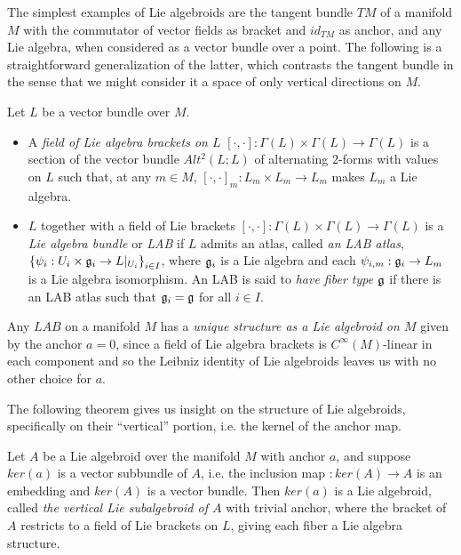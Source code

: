 \linea 

The simplest examples of Lie algebroids are the tangent bundle $TM$ of a manifold $M$ with the commutator of vector fields as bracket and $id_{TM}$ as anchor, and any Lie algebra, when considered as a vector bundle over a point. The following is a straightforward generalization of the latter, which contrasts the tangent bundle in the sense that we might consider it a space of only vertical directions on $M$.

\begin{definition}[LAB]\label{defnLAB}
    Let $L$ be a vector bundle over $M$.
    
    \begin{itemize}
    
    \item A \emph{field of Lie algebra brackets on $L$} $[\cdot, \cdot]:\Gamma(L) \times \Gamma(L) \to \Gamma(L)$ is a section of the vector bundle $Alt^2(L; L)$ of alternating $2$-forms with values on $L$ such that, at any $m \in M$, $[\cdot, \cdot]_m:L_m \times L_m \to L_m$ makes $L_m$ a Lie algebra.
    
    \item $L$ together with a field of Lie brackets $[\cdot, \cdot]:\Gamma(L) \times \Gamma(L) \to \Gamma(L)$ is a \emph{Lie algebra bundle} or \emph{LAB} if $L$ admits an atlas, called \emph{an LAB atlas}, $\left\{ \psi_i: U_i \times \mathfrak{g}_i \to L|_{U_i} \right\}_{i \in I}$, where $\mathfrak{g}_i$ is a Lie algebra and each $\psi_{i, m}: \mathfrak{g}_i \to L_m$ is a Lie algebra isomorphism. An LAB is said to \emph{have fiber type $\mathfrak{g}$} if there is an LAB atlas such that $\mathfrak{g}_i = \mathfrak{g}$ for all $i \in I$.
    
    \end{itemize}
    
\end{definition}

Any $LAB$ on a manifold $M$ has a \emph{unique structure as a Lie algebroid on $M$} given by the anchor $a = 0$, since a field of Lie algebra brackets is $C^\infty(M)$-linear in each component and so the Leibniz identity of Lie algebroids leaves us with no other choice for $a$.

The following theorem gives us insight on the structure of Lie algebroids, specifically on their ``vertical'' portion, i.e. the kernel of the anchor map.

\begin{theorem} \label{theoFiberLie}
Let $A$ be a Lie algebroid over the manifold $M$ with anchor $a$, and suppose $ker(a)$ is a vector subbundle of $A$, i.e. the inclusion map $:ker(A) \to A$ is an embedding and $ker(A)$ is a vector bundle. Then $ker(a)$ %
is a Lie algebroid, called \emph{the vertical Lie subalgebroid of $A$} with trivial anchor, where the bracket of $A$ restricts to a field of Lie brackets on $L$, giving each fiber a Lie algebra structure.
\end{theorem}

